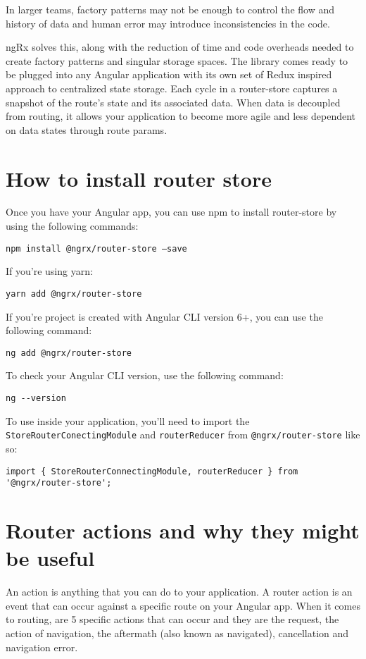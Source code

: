 In larger teams, factory patterns may not be enough to control the flow and
history of data and human error may introduce inconsistencies in the code.

ngRx solves this, along with the reduction of time and code overheads needed to
create factory patterns and singular storage spaces. The library comes ready to
be plugged into any Angular application with its own set of Redux inspired
approach to centralized state storage. Each cycle in a router-store captures a
snapshot of the route's state and its associated data. When data is decoupled
from routing, it allows your application to become more agile and less dependent
on data states through route params.

\section{How to install router store}
Once you have your Angular app, you can use npm to install router-store by 
using the following commands:

\begin{verbatim}
npm install @ngrx/router-store –save
\end{verbatim}

If you're using yarn:
\begin{verbatim}
yarn add @ngrx/router-store
\end{verbatim}

If you're project is created with Angular CLI version 6+, you can use the
following command:

\begin{verbatim}
ng add @ngrx/router-store
\end{verbatim}

To check your Angular CLI version, use the following command:
\begin{verbatim}
ng --version
\end{verbatim}

To use inside your application, you'll need to import the 
\lstinline{StoreRouterConectingModule} and \lstinline{routerReducer} from 
\lstinline{@ngrx/router-store} like so:

\begin{lstlisting}
import { StoreRouterConnectingModule, routerReducer } from '@ngrx/router-store';
\end{lstlisting}

\section{Router actions and why they might be useful}
An action is anything that you can do to your application. A router action is an
event that can occur against a specific route on your Angular app. When it comes
to routing, are 5 specific actions that can occur and they are the request, the
action of navigation, the aftermath (also known as navigated), cancellation and
navigation error.

